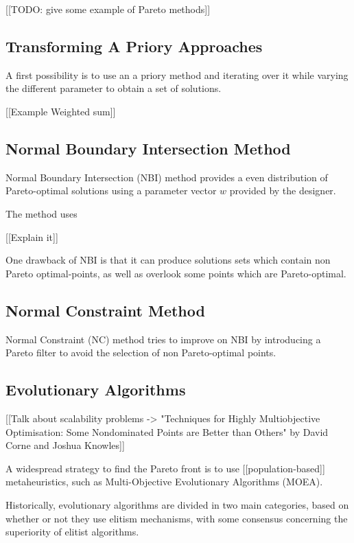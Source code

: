[[TODO: give some example of Pareto methods]]

\subsection{Transforming A Priory Approaches}

A first possibility is to use an a priory method and iterating over it while varying the different parameter to obtain a set of solutions.

[[Example Weighted sum]]

\subsection{Normal Boundary Intersection Method}

Normal Boundary Intersection (NBI)\cite{S1052623496307510} method provides a even distribution of Pareto-optimal solutions using a parameter vector $w$ provided by the designer.

The method uses

[[Explain it]]

One drawback of NBI is that it can produce solutions sets which contain non Pareto optimal-points, as well as overlook some points which are Pareto-optimal.

\subsection{Normal Constraint Method}

Normal Constraint (NC) method tries to improve on NBI by introducing a Pareto filter to avoid the selection of non Pareto-optimal points.

\subsection{Evolutionary Algorithms}

[[Talk about scalability problems -> "Techniques for Highly Multiobjective Optimisation: Some Nondominated Points are Better than Others" by David Corne and Joshua Knowles]]


A widespread strategy to find the Pareto front is to use [[population-based]] metaheuristics, such as Multi-Objective Evolutionary Algorithms (MOEA). 

Historically, evolutionary algorithms are divided in two main categories, based on whether or not they use elitism mechanisms, with some consensus concerning the superiority of elitist algorithms.

